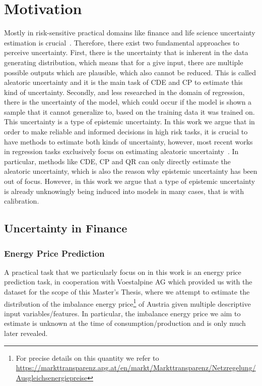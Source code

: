 \section{Motivation}\label{sec:motivation}

Mostly in risk-sensitive practical domains like finance and life science uncertainty estimation is crucial~\cite{abdar2021review, xia2020uncertainty, ghesu2021quantifying, mashrur2020machine}. Therefore, there exist two fundamental approaches to perceive uncertainty. First, there is the uncertainty that is inherent in the data generating distribution, which means that for a give input, there are multiple possible outputs which are plausible, which also cannot be reduced. This is called aleatoric uncertainty and it is the main task of CDE and CP to estimate this kind of uncertainty. Secondly, and less researched in the domain of regression, there is the uncertainty of the model, which could occur if the model is shown a sample that it cannot generalize to, based on the training data it was trained on. This uncertainty is a type of epistemic uncertainty. In this work we argue that in order to make reliable and informed decisions in high risk tasks, it is crucial to have methods to estimate both kinds of uncertainty, however, most recent works in regression tasks exclusively focus on estimating aleatoric uncertainty~\cite{romano2019conformalized, sesia2020comparison, angelopoulos2021gentle,chernozhukov2021distributional,sesia2021conformal, oliveira2022split, romano2022conformal, izbicki2022cd, gupta2022nested, auer2024conformal}. In particular, methods like CDE, CP and QR can only directly estimate the aleatoric uncertainty, which is also the reason why epistemic uncertainty has been out of focus. However, in this work we argue that a type of epistemic uncertainty is already unknowingly being induced into models in many cases, that is with calibration.

\subsection{Uncertainty in Finance}\label{sec:intro_finance}

\subsubsection{Energy Price Prediction}

A practical task that we particularly focus on in this work is an energy price prediction task, in cooperation with Voestalpine AG which provided us with the dataset for the scope of this Master's Thesis, where we attempt to estimate the distribution of the imbalance energy price\footnote{For precise details on this quantity we refer to \url{https://markttransparenz.apg.at/en/markt/Markttransparenz/Netzregelung/Ausgleichsenergiepreise}} of Austria given multiple descriptive input variables/features. In particular, the imbalance energy price we aim to estimate is unknown at the time of consumption/production and is only much later revealed.


